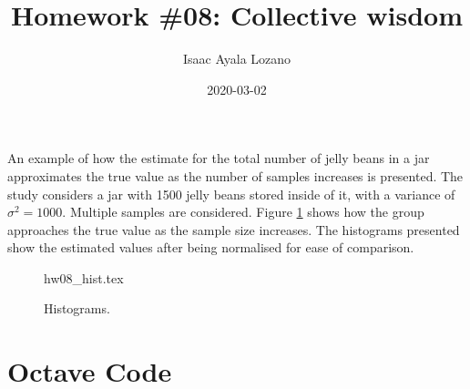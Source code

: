 \documentclass[a4paper,12pt]{article}
\title{Homework \#08: Collective wisdom}
\author{Isaac Ayala Lozano}
\date{2020-03-02}
\begin{document}
\maketitle

An example of how the estimate for the total number of jelly beans in a jar approximates the true value as the number of samples increases is presented.
The study considers a jar with 1500 jelly beans stored inside of it, with a variance of $\sigma^2 = 1000$.
Multiple samples are considered.
Figure \ref{fig: hist} shows how the group approaches the true value as the sample size increases.
The histograms presented show the estimated values after being normalised for ease of comparison.

\begin{figure}[htb!]
\centering
{hw08_hist.tex}
\caption{Histograms.}
\label{fig: hist}
\end{figure}


\newpage
\pagebreak
\appendix
\section{Octave Code}

\end{document}
